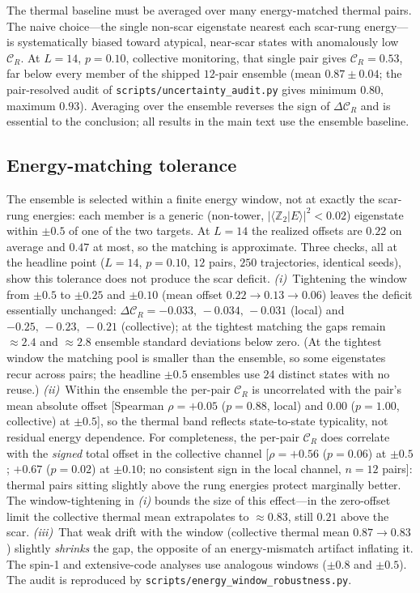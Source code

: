\documentclass[a4paper,11pt,twocolumn,unpublished]{quantumarticle}
\newcommand{\CR}{\mathcal{C}_R}
\newcommand{\Ztwo}{\mathbb{Z}_2}
\begin{document}
The thermal baseline must be averaged over many energy-matched thermal pairs.
The naive choice---the single non-scar eigenstate nearest each scar-rung
energy---is systematically biased toward atypical, near-scar states with
anomalously low $\CR$. At $L=14$, $p=0.10$, collective monitoring, that single
pair gives $\CR=0.53$, far below every member of the shipped $12$-pair
ensemble (mean $0.87\pm0.04$; the pair-resolved audit of
\texttt{scripts/uncertainty\_audit.py} gives minimum $0.80$, maximum
$0.93$). Averaging over the
ensemble reverses the sign of $\Delta\CR$ and is essential to the conclusion;
all results in the main text use the ensemble baseline.

\subsection{Energy-matching tolerance}
The ensemble is selected within a finite energy window, not at exactly the
scar-rung energies: each member is a generic (non-tower,
$|\langle\Ztwo|E\rangle|^2<0.02$) eigenstate within $\pm0.5$ of one of the two
targets. At $L=14$ the realized offsets are $0.22$ on average and $0.47$ at
most, so the matching is approximate. Three checks, all at the headline point
($L{=}14$, $p{=}0.10$, $12$ pairs, $250$ trajectories, identical seeds), show
this tolerance does not produce the scar deficit. \emph{(i)}~Tightening the
window from $\pm0.5$ to $\pm0.25$ and $\pm0.10$ (mean offset
$0.22\to0.13\to0.06$) leaves the deficit essentially unchanged:
$\Delta\CR=-0.033,\,-0.034,\,-0.031$ (local) and $-0.25,\,-0.23,\,-0.21$
(collective); at the tightest matching the gaps remain $\approx2.4$ and
$\approx2.8$ ensemble standard deviations below zero. (At the tightest
window the matching pool is smaller than the ensemble, so some eigenstates
recur across pairs; the headline $\pm0.5$ ensembles use $24$ distinct states
with no reuse.) \emph{(ii)}~Within the
ensemble the per-pair $\CR$ is uncorrelated with the pair's mean absolute
offset [Spearman $\rho=+0.05$ ($p=0.88$, local) and $0.00$ ($p=1.00$,
collective) at $\pm0.5$], so the thermal band reflects state-to-state
typicality, not residual energy dependence. For completeness, the per-pair
$\CR$ does correlate with the \emph{signed} total offset in the collective
channel [$\rho=+0.56$ ($p=0.06$) at $\pm0.5$; $+0.67$ ($p=0.02$) at
$\pm0.10$; no consistent sign in the local channel, $n=12$ pairs]: thermal
pairs sitting slightly above the rung energies protect marginally better.
The window-tightening in \emph{(i)} bounds the size of this effect---in the
zero-offset limit the collective thermal mean extrapolates to
$\approx0.83$, still $0.21$ above the scar. \emph{(iii)}~That weak drift with
the window (collective thermal mean $0.87\to0.83$) slightly \emph{shrinks} the
gap, the opposite of an energy-mismatch artifact inflating it. The spin-1 and
extensive-code analyses use analogous windows ($\pm0.8$ and $\pm0.5$). The
audit is reproduced by \texttt{scripts/energy\_window\_robustness.py}.
\end{document}
